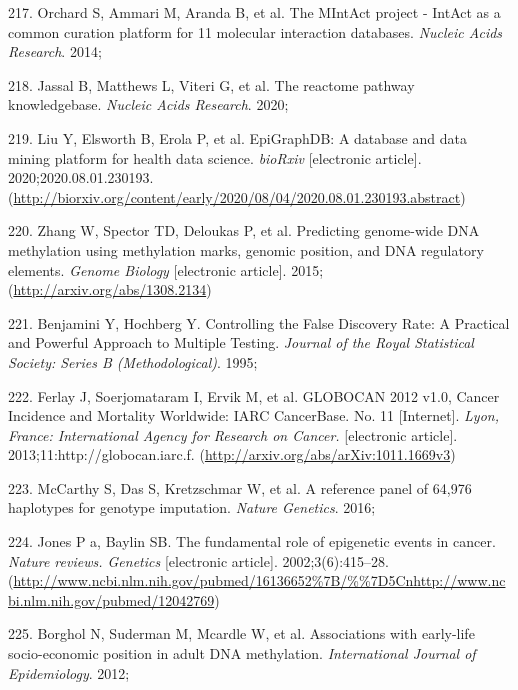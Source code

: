 \documentclass[11pt,oneside]{bristolthesis}
\newenvironment{cslreferences}%
  {}%
  {\par}
\begin{document}
\begin{cslreferences}
\leavevmode\hypertarget{ref-Orchard2014}{}%
217. Orchard S, Ammari M, Aranda B, et al. The MIntAct project - IntAct as a common curation platform for 11 molecular interaction databases. \emph{Nucleic Acids Research}. 2014;

\leavevmode\hypertarget{ref-Jassal2020}{}%
218. Jassal B, Matthews L, Viteri G, et al. The reactome pathway knowledgebase. \emph{Nucleic Acids Research}. 2020;

\leavevmode\hypertarget{ref-Liu2020}{}%
219. Liu Y, Elsworth B, Erola P, et al. EpiGraphDB: A database and data mining platform for health data science. \emph{bioRxiv} {[}electronic article{]}. 2020;2020.08.01.230193. (\url{http://biorxiv.org/content/early/2020/08/04/2020.08.01.230193.abstract})

\leavevmode\hypertarget{ref-Zhang2015}{}%
220. Zhang W, Spector TD, Deloukas P, et al. Predicting genome-wide DNA methylation using methylation marks, genomic position, and DNA regulatory elements. \emph{Genome Biology} {[}electronic article{]}. 2015;(\url{http://arxiv.org/abs/1308.2134})

\leavevmode\hypertarget{ref-Benjamini1995}{}%
221. Benjamini Y, Hochberg Y. Controlling the False Discovery Rate: A Practical and Powerful Approach to Multiple Testing. \emph{Journal of the Royal Statistical Society: Series B (Methodological)}. 1995;

\leavevmode\hypertarget{ref-Ferlay2013}{}%
222. Ferlay J, Soerjomataram I, Ervik M, et al. GLOBOCAN 2012 v1.0, Cancer Incidence and Mortality Worldwide: IARC CancerBase. No. 11 {[}Internet{]}. \emph{Lyon, France: International Agency for Research on Cancer.} {[}electronic article{]}. 2013;11:http://globocan.iarc.f. (\url{http://arxiv.org/abs/arXiv:1011.1669v3})

\leavevmode\hypertarget{ref-McCarthy2016}{}%
223. McCarthy S, Das S, Kretzschmar W, et al. A reference panel of 64,976 haplotypes for genotype imputation. \emph{Nature Genetics}. 2016;

\leavevmode\hypertarget{ref-Jones2002}{}%
224. Jones P a, Baylin SB. The fundamental role of epigenetic events in cancer. \emph{Nature reviews. Genetics} {[}electronic article{]}. 2002;3(6):415--28. (\url{http://www.ncbi.nlm.nih.gov/pubmed/16136652\%7B/\%\%7D5Cnhttp://www.ncbi.nlm.nih.gov/pubmed/12042769})

\leavevmode\hypertarget{ref-Borghol2012}{}%
225. Borghol N, Suderman M, Mcardle W, et al. Associations with early-life socio-economic position in adult DNA methylation. \emph{International Journal of Epidemiology}. 2012;


\end{cslreferences}
\end{document}
